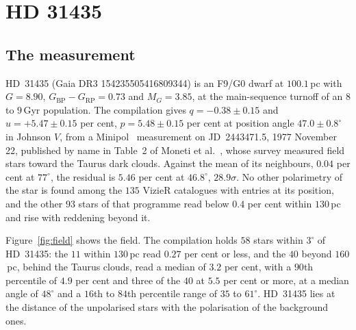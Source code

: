 \documentclass[3p,11pt]{elsarticle}
\begin{document}
\section{HD 31435}\label{sec:hd}

\subsection{The measurement}

HD~31435 (Gaia DR3 154235505416809344) is an F9/G0 dwarf at $100.1$\,pc with
$G=8.90$, $G_\mathrm{BP}-G_\mathrm{RP}=0.73$ and $M_G=3.85$, at the main-sequence
turnoff of an $8$ to $9$\,Gyr population. The compilation gives
$q=-0.38\pm0.15$ and $u=+5.47\pm0.15$ per cent, $p=5.48\pm0.15$ per cent at position
angle $47.0\pm0.8^\circ$ in Johnson $V$, from a Minipol~\cite{Frecker1976} measurement on
JD~2443471.5, 1977 November 22, published by name in Table~2 of Moneti et
al.~\cite{Moneti1984}, whose survey measured field stars toward the Taurus dark clouds.
Against the mean of its neighbours, $0.04$ per cent at $77^\circ$, the residual is
$5.46$ per cent at $46.8^\circ$, $28.9\sigma$. No other polarimetry of the star is found
among the $135$ VizieR catalogues with entries at its position, and the other $93$ stars
of that programme read below $0.4$ per cent within $130$\,pc and rise with reddening
beyond it.

Figure~\ref{fig:field} shows the field. The compilation holds $58$ stars within $3^\circ$
of HD~31435: the $11$ within $130$\,pc read $0.27$ per cent or less, and the $40$
beyond $160$\,pc, behind the Taurus clouds, read a median of $3.2$ per cent, with a
$90$th percentile of $4.9$ per cent and three of the $40$ at $5.5$ per cent or more, at
a median angle of $48^\circ$ and a $16$th to $84$th percentile range of $35$ to
$61^\circ$. HD~31435 lies at the distance of the unpolarised stars with the
polarisation of the background ones.
\end{document}
